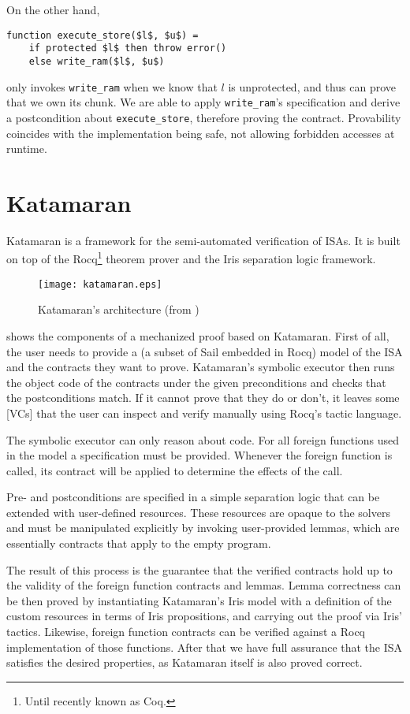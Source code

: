 On the other hand,
\begin{lstlisting}[language=sail, mathescape]
  function execute_store($l$, $u$) =
    if protected $l$ then throw error()
    else write_ram($l$, $u$)
\end{lstlisting}
only invokes \texttt{write\_ram} when we know that \(l\) is unprotected, and thus can prove that we own its chunk. We are able to apply \texttt{write\_ram}'s specification and derive a postcondition about \texttt{execute\_store}, therefore proving the contract. Provability coincides with the implementation being safe, \ie not allowing forbidden accesses at runtime.

\section{Katamaran}
\label{sec:katamaran}

Katamaran \cite{Huyghebaert2023} is a framework for the semi-automated verification of ISAs. It is built on top of the Rocq\footnote{Until recently known as Coq.} theorem prover and the Iris separation logic framework.

\begin{figure}[htb]
  \centering
  \texttt{[image: katamaran.eps]}
  \caption{Katamaran's architecture (from \cite{Huyghebaert2023})}
  \label{fig:katamaran}
\end{figure}

 shows the components of a mechanized proof based on Katamaran. First of all, the user needs to provide a \usail (a subset of Sail embedded in Rocq) model of the ISA and the contracts they want to prove. Katamaran's symbolic executor then runs the object code of the contracts under the given preconditions and checks that the postconditions match. If it cannot prove that they do or don't, it leaves some [VCs] that the user can inspect and verify manually using Rocq's tactic language.

The symbolic executor can only reason about \usail code. For all foreign functions used in the model a specification must be provided. Whenever the foreign function is called, its contract will be applied to determine the effects of the call.

Pre- and postconditions are specified in a simple separation logic that can be extended with user-defined resources. These resources are opaque to the solvers and must be manipulated explicitly by invoking user-provided lemmas, which are essentially contracts that apply to the empty program.

The result of this process is the guarantee that the verified contracts hold up to the validity of the foreign function contracts and lemmas. Lemma correctness can be then proved by instantiating Katamaran's Iris model with a definition of the custom resources in terms of Iris propositions, and carrying out the proof via Iris' tactics. Likewise, foreign function contracts can be verified against a Rocq implementation of those functions. After that we have full assurance that the ISA satisfies the desired properties, as Katamaran itself is also proved correct.

